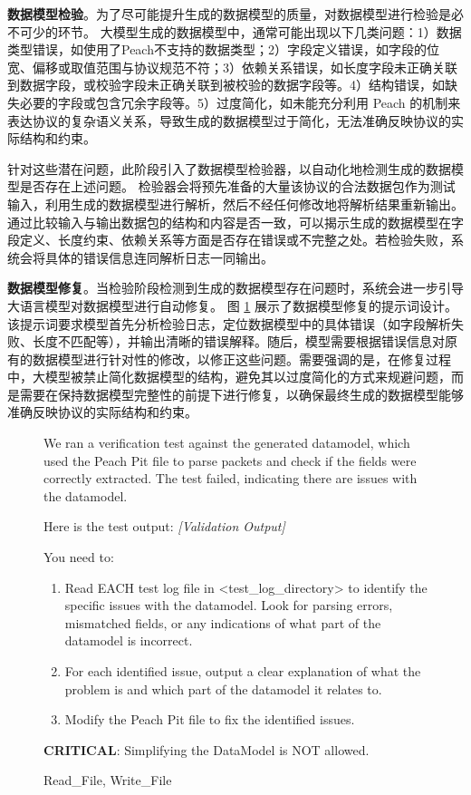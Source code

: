 \textbf{数据模型检验}。为了尽可能提升生成的数据模型的质量，对数据模型进行检验是必不可少的环节。
大模型生成的数据模型中，通常可能出现以下几类问题：1）数据类型错误，如使用了Peach不支持的数据类型；2）字段定义错误，如字段的位宽、偏移或取值范围与协议规范不符；3）依赖关系错误，如长度字段未正确关联到数据字段，或校验字段未正确关联到被校验的数据字段等。4）结构错误，如缺失必要的字段或包含冗余字段等。5）过度简化，如未能充分利用 Peach 的机制来表达协议的复杂语义关系，导致生成的数据模型过于简化，无法准确反映协议的实际结构和约束。

针对这些潜在问题，此阶段引入了数据模型检验器，以自动化地检测生成的数据模型是否存在上述问题。
检验器会将预先准备的大量该协议的合法数据包作为测试输入，利用生成的数据模型进行解析，然后不经任何修改地将解析结果重新输出。通过比较输入与输出数据包的结构和内容是否一致，可以揭示生成的数据模型在字段定义、长度约束、依赖关系等方面是否存在错误或不完整之处。若检验失败，系统会将具体的错误信息连同解析日志一同输出。

\textbf{数据模型修复}。当检验阶段检测到生成的数据模型存在问题时，系统会进一步引导大语言模型对数据模型进行自动修复。
图 \ref{fig:prompt_3} 展示了数据模型修复的提示词设计。该提示词要求模型首先分析检验日志，定位数据模型中的具体错误（如字段解析失败、长度不匹配等），并输出清晰的错误解释。随后，模型需要根据错误信息对原有的数据模型进行针对性的修改，以修正这些问题。需要强调的是，在修复过程中，大模型被禁止简化数据模型的结构，避免其以过度简化的方式来规避问题，而是需要在保持数据模型完整性的前提下进行修复，以确保最终生成的数据模型能够准确反映协议的实际结构和约束。

\begin{figure}[H]
\centering
\begin{tcolorbox}[
    before upper=\linespread{1.2}\selectfont
]
 We ran a verification test against the generated datamodel, which used the Peach Pit file to parse packets and check if the fields were correctly extracted. 
The test failed, indicating there are issues with the datamodel.

Here is the test output:
\textit{[Validation Output]}

You need to:

\begin{enumerate}
    \item Read EACH test log file in <test\_log\_directory> to identify the specific issues with the datamodel. Look for parsing errors, mismatched fields, or any indications of what part of the datamodel is incorrect.
    \item For each identified issue, output a clear explanation of what the problem is and which part of the datamodel it relates to.
    \item Modify the Peach Pit file to fix the identified issues.
\end{enumerate}

\textbf{CRITICAL}: Simplifying the DataModel is NOT allowed.

\prule

 Read\_File, Write\_File
\end{tcolorbox}
\label{fig:prompt_3}
\end{figure}

